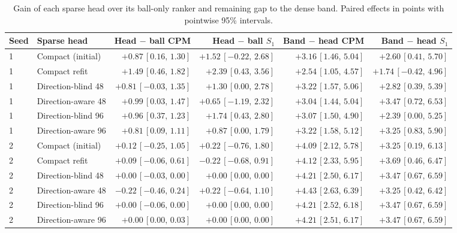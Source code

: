\begin{table}[!t]
\centering
\footnotesize\setlength{\tabcolsep}{4pt}
\caption{Gain of each sparse head over its ball-only ranker and remaining gap to the dense band. Paired effects in points with pointwise 95\% intervals.}
\label{tab:attention_gains}
\begin{tabular}{@{}llrrrr@{}}
\toprule
Seed & Sparse head & Head $-$ ball CPM & Head $-$ ball $S_1$ & Band $-$ head CPM & Band $-$ head $S_1$ \\
\midrule
1 & Compact (initial) & $+0.87\,[0.16,\,1.30]$ & $+1.52\,[-0.22,\,2.68]$ & $+3.16\,[1.46,\,5.04]$ & $+2.60\,[0.41,\,5.70]$ \\
1 & Compact refit & $+1.49\,[0.46,\,1.82]$ & $+2.39\,[0.43,\,3.56]$ & $+2.54\,[1.05,\,4.57]$ & $+1.74\,[-0.42,\,4.96]$ \\
1 & Direction-blind 48 & $+0.81\,[-0.03,\,1.35]$ & $+1.30\,[0.00,\,2.78]$ & $+3.22\,[1.57,\,5.06]$ & $+2.82\,[0.39,\,5.39]$ \\
1 & Direction-aware 48 & $+0.99\,[0.03,\,1.47]$ & $+0.65\,[-1.19,\,2.32]$ & $+3.04\,[1.44,\,5.04]$ & $+3.47\,[0.72,\,6.53]$ \\
1 & Direction-blind 96 & $+0.96\,[0.37,\,1.23]$ & $+1.74\,[0.43,\,2.80]$ & $+3.07\,[1.50,\,4.90]$ & $+2.39\,[0.00,\,5.25]$ \\
1 & Direction-aware 96 & $+0.81\,[0.09,\,1.11]$ & $+0.87\,[0.00,\,1.79]$ & $+3.22\,[1.58,\,5.12]$ & $+3.25\,[0.83,\,5.90]$ \\
\midrule
2 & Compact (initial) & $+0.12\,[-0.25,\,1.05]$ & $+0.22\,[-0.76,\,1.80]$ & $+4.09\,[2.12,\,5.78]$ & $+3.25\,[0.19,\,6.13]$ \\
2 & Compact refit & $+0.09\,[-0.06,\,0.61]$ & $-0.22\,[-0.68,\,0.91]$ & $+4.12\,[2.33,\,5.95]$ & $+3.69\,[0.46,\,6.47]$ \\
2 & Direction-blind 48 & $+0.00\,[-0.03,\,0.00]$ & $+0.00\,[0.00,\,0.00]$ & $+4.21\,[2.50,\,6.17]$ & $+3.47\,[0.67,\,6.59]$ \\
2 & Direction-aware 48 & $-0.22\,[-0.46,\,0.24]$ & $+0.22\,[-0.64,\,1.10]$ & $+4.43\,[2.63,\,6.39]$ & $+3.25\,[0.42,\,6.42]$ \\
2 & Direction-blind 96 & $+0.00\,[-0.06,\,0.00]$ & $+0.00\,[0.00,\,0.00]$ & $+4.21\,[2.52,\,6.18]$ & $+3.47\,[0.67,\,6.59]$ \\
2 & Direction-aware 96 & $+0.00\,[0.00,\,0.03]$ & $+0.00\,[0.00,\,0.00]$ & $+4.21\,[2.51,\,6.17]$ & $+3.47\,[0.67,\,6.59]$ \\
\bottomrule
\end{tabular}
\end{table}
